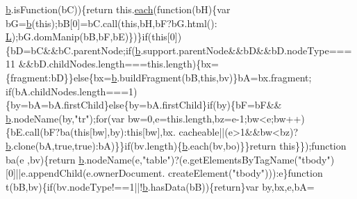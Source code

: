 \begin{DoxyCode}
      \hyperlink{docs_2_programmer's_manual_2html_2jquery_8js_aa4026ad5544b958e54ce5e106fa1c805}{b}.isFunction(bC))\{\textcolor{keywordflow}{return} this.\hyperlink{docs_2_programmer's_manual_2html_2jquery_8js_a871ff39db627c54c710a3e9909b8234c}{each}(\textcolor{keyword}{function}(bH)\{var bG=\hyperlink{docs_2_programmer's_manual_2html_2jquery_8js_aa4026ad5544b958e54ce5e106fa1c805}{b}(\textcolor{keyword}{this});bB[0]=bC.call(\textcolor{keyword}{this},bH,bF?bG.html():
      \hyperlink{docs_2_programmer's_manual_2html_2jquery_8js_a38ee4c0b5f4fe2a18d0c783af540d253}{L});bG.domManip(bB,bF,bE)\})\}\textcolor{keywordflow}{if}(\textcolor{keyword}{this}[0])\{bD=bC&&bC.parentNode;\textcolor{keywordflow}{if}(\hyperlink{docs_2_programmer's_manual_2html_2jquery_8js_aa4026ad5544b958e54ce5e106fa1c805}{b}.support.parentNode&&bD&&bD.nodeType===11
      &&bD.childNodes.length===\textcolor{keyword}{this}.length)\{bx=\{fragment:bD\}\}\textcolor{keywordflow}{else}\{bx=\hyperlink{docs_2_programmer's_manual_2html_2jquery_8js_aa4026ad5544b958e54ce5e106fa1c805}{b}.buildFragment(bB,\textcolor{keyword}{this},bv)\}bA=bx.fragment;\textcolor{keywordflow}{
      if}(bA.childNodes.length===1)\{by=bA=bA.firstChild\}\textcolor{keywordflow}{else}\{by=bA.firstChild\}\textcolor{keywordflow}{if}(by)\{bF=bF&&
      \hyperlink{docs_2_programmer's_manual_2html_2jquery_8js_aa4026ad5544b958e54ce5e106fa1c805}{b}.nodeName(by,\textcolor{stringliteral}{"tr"});\textcolor{keywordflow}{for}(var bw=0,e=this.length,bz=e-1;bw<e;bw++)\{bE.call(bF?ba(\textcolor{keyword}{this}[bw],by):\textcolor{keyword}{this}[bw],bx.
      cacheable||(e>1&&bw<bz)?\hyperlink{docs_2_programmer's_manual_2html_2jquery_8js_aa4026ad5544b958e54ce5e106fa1c805}{b}.clone(bA,\textcolor{keyword}{true},\textcolor{keyword}{true}):bA)\}\}\textcolor{keywordflow}{if}(bv.length)\{\hyperlink{docs_2_programmer's_manual_2html_2jquery_8js_aa4026ad5544b958e54ce5e106fa1c805}{b}.each(bv,bo)\}\}\textcolor{keywordflow}{return} \textcolor{keyword}{this}\}\});\textcolor{keyword}{function} ba(e
      ,bv)\{\textcolor{keywordflow}{return} \hyperlink{docs_2_programmer's_manual_2html_2jquery_8js_aa4026ad5544b958e54ce5e106fa1c805}{b}.nodeName(e,\textcolor{stringliteral}{"table"})?(e.getElementsByTagName(\textcolor{stringliteral}{"tbody"})[0]||e.appendChild(e.ownerDocument.
      createElement(\textcolor{stringliteral}{"tbody"}))):e\}\textcolor{keyword}{function} t(bB,bv)\{\textcolor{keywordflow}{if}(bv.nodeType!==1||!\hyperlink{docs_2_programmer's_manual_2html_2jquery_8js_aa4026ad5544b958e54ce5e106fa1c805}{b}.hasData(bB))\{\textcolor{keywordflow}{return}\}var by,bx,e,bA=

\end{DoxyCode}
